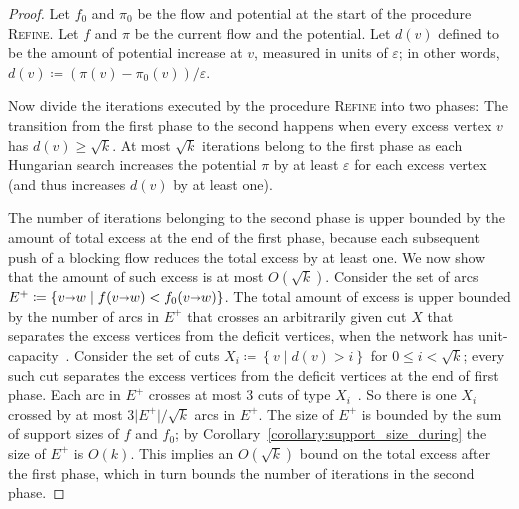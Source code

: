 \documentclass[a4paper,UKenglish]{socg-lipics-v2018}
\makeatletter
\def\etal{\emph{et~al.}}
\def\etal{\textit{et~al.}}
\def\eps{\varepsilon}
\def\abs#1{\mathopen| #1 \mathclose|}		%
\def\Set#1{\left\{ #1 \right\}}
\def\arcto{\mathord\shortrightarrow}
\def\arc#1#2{#1\arcto#2}
\theoremstyle{plain}
\numberwithin{figure}{section}
\def\EMPH#1{\textcolor{BrickRed}{{\emph{#1}}}}
\def\n@te#1{\textsf{\boldmath \textbf{$\langle\!\langle$#1$\rangle\!\rangle$}}\leavevmode}
\def\note#1{\textcolor{red}{\n@te{#1}}}
\renewcommand{\note}[1]{} %
\makeatother
\begin{document}
\begin{proof}
Let $f_0$ and $\pi_0$ be the flow and potential at the start of the procedure \textsc{Refine}.  Let $f$ and $\pi$ be the current flow and the potential.
Let \EMPH{$d(v)$} defined to be the amount of potential increase at $v$, measured in units of $\eps$; in other words, $d(v) \coloneqq (\pi(v) - \pi_0(v)) / \eps$.
%

Now divide the iterations executed by
the procedure \textsc{Refine}
into two phases:  The transition from the first phase to the second happens when every excess vertex $v$ has $d(v) \ge \sqrt{k}$.
%
At most $\sqrt{k}$ iterations belong to
the first phase as each Hungarian search increases the potential $\pi$ by at least $\eps$ for each excess vertex (and thus increases $d(v)$ by at least one).

The number of iterations
belonging to the second phase is upper bounded by the amount of total excess at the end of the first phase, because each subsequent push of a blocking flow reduces the total excess by at least one.  We now show that the amount of such excess is at most $O(\sqrt{k})$.
%
Consider the set of arcs $E^+ \coloneqq \Set{\arc vw \mid f(\arc vw) < f_0(\arc vw)}$.
The total amount of excess is upper bounded by the number of arcs in $E^+$ that crosses an arbitrarily given cut $X$ that separates the excess vertices from the deficit vertices, when the network has unit-capacity~\cite[Lemma~3.6]{GHKT17}.
%
Consider the set of cuts $X_i \coloneqq \Set{v \mid d(v) > i}$ for $0 \le i < \sqrt{k}$; every such cut separates the excess vertices from the deficit vertices at the end of first phase.
Each arc in $E^+$ crosses at most $3$ cuts of type $X_i$~\cite[Lemma~3.1]{GHKT17}.  So there is one $X_i$ crossed by at most $3\abs{E^+}/\sqrt{k}$ arcs in $E^+$.
%
The size of $E^+$ is bounded by the sum of support sizes of $f$ and $f_0$; by Corollary~\ref{corollary:support_size_during} the size of $E^+$ is $O(k)$.
This implies an $O(\sqrt{k})$ bound on the total excess after the first phase, which in turn bounds the number of iterations in the second phase.
\end{proof}
\end{document}
